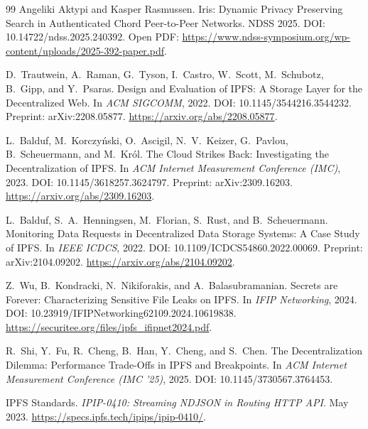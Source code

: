 \documentclass[11pt]{article}
\begin{document}
\begin{thebibliography}{99}
Angeliki Aktypi and Kasper Rasmussen.
\newblock Iris: Dynamic Privacy Preserving Search in Authenticated Chord Peer-to-Peer Networks.
\newblock NDSS 2025.
\newblock DOI: 10.14722/ndss.2025.240392.
\newblock Open PDF: \url{https://www.ndss-symposium.org/wp-content/uploads/2025-392-paper.pdf}.

D.~Trautwein, A.~Raman, G.~Tyson, I.~Castro, W.~Scott, M.~Schubotz, B.~Gipp, and Y.~Psaras.
\newblock Design and Evaluation of {IPFS}: A Storage Layer for the Decentralized Web.
\newblock In \emph{ACM SIGCOMM}, 2022.
\newblock DOI: 10.1145/3544216.3544232.
\newblock Preprint: arXiv:2208.05877.
\newblock \url{https://arxiv.org/abs/2208.05877}.

L.~Balduf, M.~Korczy\'nski, O.~Ascigil, N.~V.~Keizer, G.~Pavlou, B.~Scheuermann, and M.~Kr\'ol.
\newblock The Cloud Strikes Back: Investigating the Decentralization of {IPFS}.
\newblock In \emph{ACM Internet Measurement Conference (IMC)}, 2023.
\newblock DOI: 10.1145/3618257.3624797.
\newblock Preprint: arXiv:2309.16203.
\newblock \url{https://arxiv.org/abs/2309.16203}.

L.~Balduf, S.~A.~Henningsen, M.~Florian, S.~Rust, and B.~Scheuermann.
\newblock Monitoring Data Requests in Decentralized Data Storage Systems: A Case Study of {IPFS}.
\newblock In \emph{IEEE ICDCS}, 2022.
\newblock DOI: 10.1109/ICDCS54860.2022.00069.
\newblock Preprint: arXiv:2104.09202.
\newblock \url{https://arxiv.org/abs/2104.09202}.

Z.~Wu, B.~Kondracki, N.~Nikiforakis, and A.~Balasubramanian.
\newblock Secrets are Forever: Characterizing Sensitive File Leaks on {IPFS}.
\newblock In \emph{IFIP Networking}, 2024.
\newblock DOI: 10.23919/IFIPNetworking62109.2024.10619838.
\newblock \url{https://securitee.org/files/ipfs_ifipnet2024.pdf}.

R.~Shi, Y.~Fu, R.~Cheng, B.~Han, Y.~Cheng, and S.~Chen.
\newblock The Decentralization Dilemma: Performance Trade-Offs in {IPFS} and Breakpoints.
\newblock In \emph{ACM Internet Measurement Conference (IMC '25)}, 2025.
\newblock DOI: 10.1145/3730567.3764453.

IPFS Standards.
\newblock \emph{IPIP-0410: Streaming NDJSON in Routing HTTP API}.
 May 2023.
\newblock \url{https://specs.ipfs.tech/ipips/ipip-0410/}.


\end{thebibliography}
\end{document}
